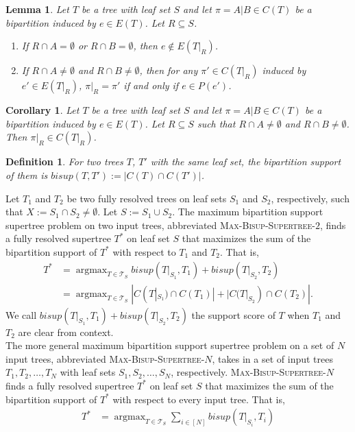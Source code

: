 \documentclass{article}
\DeclareMathOperator*{\argmax}{argmax}
\newcommand{\bs}{bisup}
\newtheorem{lemma}{Lemma}
\newtheorem{corollary}{Corollary}
\newtheorem{definition}{Definition}
\begin{document}
\begin{lemma} \label{lem:bipar_restrict_edge}
    Let $T$ be a tree with leaf set $S$ and let $\pi = A|B \in C(T)$ be a bipartition induced by $e \in E(T)$. Let $R \subseteq S$.
    \begin{enumerate}
        \item If $R \cap A = \emptyset$ or $R \cap B = \emptyset$, then $e \notin E(T|_R)$.
        \item If $R \cap A \neq \emptyset$ and $R \cap B \neq \emptyset$, then for any $\pi' \in C(T|_R)$ induced by $e' \in E(T|_R)$, $\pi|_R = \pi'$ if and only if $e \in P(e')$.
    \end{enumerate}
\end{lemma}

\begin{corollary} \label{cor:bipar_restrict}
    Let $T$ be a tree with leaf set $S$ and let $\pi = A|B \in C(T)$ be a bipartition induced by $e \in E(T)$. Let $R \subseteq S$ such that $R \cap A \neq \emptyset$ and $R \cap B \neq \emptyset$. Then $\pi|_R \in C(T|_R)$. 
\end{corollary}

\begin{definition}
For two trees $T$, $T'$ with the same leaf set, the \textit{bipartition support} of them is $\bs(T, T') := |C(T) \cap C(T')|$.
\end{definition}

Let $T_1$ and $T_2$ be two fully resolved trees on leaf sets $S_1$ and $S_2$, respectively, such that $X := S_1 \cap S_2 \neq \emptyset$. Let $S := S_1 \cup S_2$. The maximum bipartition support supertree problem on two input trees, abbreviated \textsc{Max-Bisup-Supertree-$2$}, finds a fully resolved supertree $T^*$ on leaf set $S$ that maximizes the sum of the bipartition support of $T^*$ with respect to $T_1$ and $T_2$. That is, 
\begin{align*}
    T^* &= \argmax_{T \in \mathcal{T}_S} \bs(T|_{S_1}, T_1) + \bs(T|_{S_2}, T_2)\\ 
        &= \argmax_{T \in \mathcal{T}_S} |C(T|_{S_1})\cap C(T_1)| + |C(T|_{S_2}) \cap C(T_2)|.
\end{align*}
We call $\bs(T|_{S_1}, T_1) + \bs(T|_{S_2}, T_2)$ the support score of $T$ when $T_1$ and $T_2$ are clear from context.\\

The more general maximum bipartition support supertree problem on a set of $N$ input trees, abbreviated \textsc{Max-Bisup-Supertree-$N$}, takes in a set of input trees $T_1,T_2,\dots,T_N$ with leaf sets $S_1,S_2,\dots,S_N$, respectively. \textsc{Max-Bisup-Supertree-$N$} finds a fully resolved supertree $T^*$ on leaf set $S$ that maximizes the sum of the bipartition support of $T^*$ with respect to every input tree. That is,
\begin{align*}
    T^* &= \argmax_{T \in \mathcal{T}_S} \sum_{i \in [N]} \bs(T|_{S_i}, T_i) \\ 
\end{align*}
\end{document}
